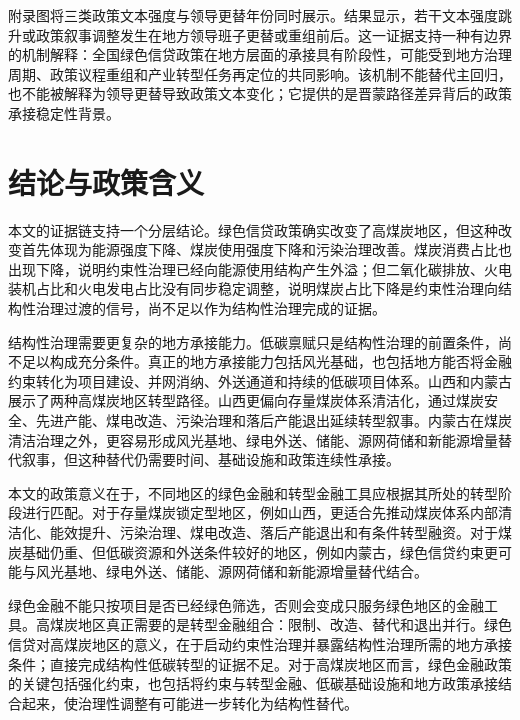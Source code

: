 \documentclass[UTF8,12pt]{ctexart}
\begin{document}
附录图将三类政策文本强度与领导更替年份同时展示。结果显示，若干文本强度跳升或政策叙事调整发生在地方领导班子更替或重组前后。这一证据支持一种有边界的机制解释：全国绿色信贷政策在地方层面的承接具有阶段性，可能受到地方治理周期、政策议程重组和产业转型任务再定位的共同影响。该机制不能替代主回归，也不能被解释为领导更替导致政策文本变化；它提供的是晋蒙路径差异背后的政策承接稳定性背景。

\section{结论与政策含义}

本文的证据链支持一个分层结论。绿色信贷政策确实改变了高煤炭地区，但这种改变首先体现为能源强度下降、煤炭使用强度下降和污染治理改善。煤炭消费占比也出现下降，说明约束性治理已经向能源使用结构产生外溢；但二氧化碳排放、火电装机占比和火电发电占比没有同步稳定调整，说明煤炭占比下降是约束性治理向结构性治理过渡的信号，尚不足以作为结构性治理完成的证据。

结构性治理需要更复杂的地方承接能力。低碳禀赋只是结构性治理的前置条件，尚不足以构成充分条件。真正的地方承接能力包括风光基础，也包括地方能否将金融约束转化为项目建设、并网消纳、外送通道和持续的低碳项目体系。山西和内蒙古展示了两种高煤炭地区转型路径。山西更偏向存量煤炭体系清洁化，通过煤炭安全、先进产能、煤电改造、污染治理和落后产能退出延续转型叙事。内蒙古在煤炭清洁治理之外，更容易形成风光基地、绿电外送、储能、源网荷储和新能源增量替代叙事，但这种替代仍需要时间、基础设施和政策连续性承接。

本文的政策意义在于，不同地区的绿色金融和转型金融工具应根据其所处的转型阶段进行匹配。对于存量煤炭锁定型地区，例如山西，更适合先推动煤炭体系内部清洁化、能效提升、污染治理、煤电改造、落后产能退出和有条件转型融资。对于煤炭基础仍重、但低碳资源和外送条件较好的地区，例如内蒙古，绿色信贷约束更可能与风光基地、绿电外送、储能、源网荷储和新能源增量替代结合。

绿色金融不能只按项目是否已经绿色筛选，否则会变成只服务绿色地区的金融工具。高煤炭地区真正需要的是转型金融组合：限制、改造、替代和退出并行。绿色信贷对高煤炭地区的意义，在于启动约束性治理并暴露结构性治理所需的地方承接条件；直接完成结构性低碳转型的证据不足。对于高煤炭地区而言，绿色金融政策的关键包括强化约束，也包括将约束与转型金融、低碳基础设施和地方政策承接结合起来，使治理性调整有可能进一步转化为结构性替代。
\end{document}
